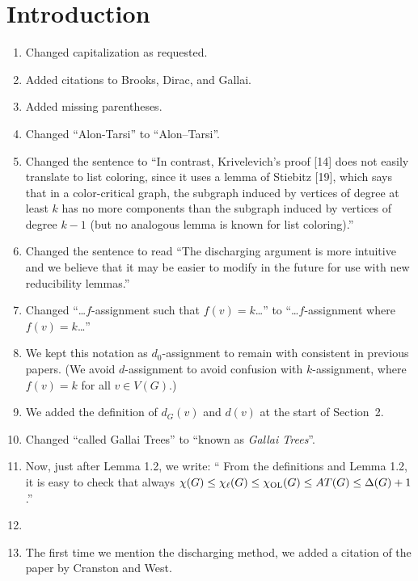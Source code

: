 \documentclass{article}
\def\chil{{\chi_\ell}}
\def\chiol{\chi_{\rm{OL}}}
\begin{document}
\section{Introduction}
\begin{enumerate}
\item Changed capitalization as requested.
\item Added citations to Brooks, Dirac, and Gallai.
\item Added missing parentheses.
\item Changed ``Alon-Tarsi'' to ``Alon--Tarsi''.
\item Changed the sentence to ``In contrast,
Krivelevich's proof [14] does not easily translate to list
coloring, since it uses a lemma of Stiebitz [19], which says that
in a color-critical graph, the subgraph induced by vertices of degree at least
$k$ has no more components than the subgraph induced by vertices of degree
$k-1$ (but no analogous lemma is known for list coloring).''
\item Changed the sentence to read ``The discharging argument is more
intuitive and we believe that it may be easier to modify in the future for use
with new reducibility lemmas.''
\item Changed ``\ldots$f$-assignment such that $f(v)=k$\ldots'' to
``\ldots$f$-assignment where $f(v)=k$\ldots'' 
\item We kept this notation as $d_0$-assignment to remain with consistent in
previous papers.  (We avoid $d$-assignment to avoid confusion with
$k$-assignment, where $f(v)=k$ for all $v\in V(G)$.)
\item We added the definition of $d_G(v)$ and $d(v)$ at the start of Section~2.
\item Changed ``called Gallai Trees'' to ``known as \emph{Gallai Trees}''.
\item Now, just after Lemma 1.2, we write: ``
From the definitions and Lemma 1.2, it is easy to check that always
$\chi(G)\le \chil(G)\le \chiol(G)\le AT(G)\le \Delta(G)+1$.''
\item
\item The first time we mention the discharging method, we added a citation of
the paper by Cranston and West.
\end{enumerate}
\end{document}
